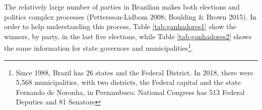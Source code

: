 \documentclass[
  12pt,
]{article}
\begin{document}
The relatively large number of parties in Brazilian makes both elections
and politics complex processes (Pettersson-Lidbom 2008; Boulding \&
Brown 2015). In order to help understanding this process, Table
\ref{tab:ganhadores1} show the winners, by party, in the last five
elections, while Table \ref{tab:ganhadores2} shows the same information
for state governors and municipalities\footnote{Since 1988, Brazil has
  26 states and the Federal District. In 2018, there were 5,568
  municipalities, with two districts, the Federal capital and the state
  Fernando de Noronha, in Pernambuco. National Congress has 513 Federal
  Deputies and 81 Senators}.

\begin{table}[H]

\caption{\label{tab:ganhadores1}Distribuition of winners by party in National Congress, 2002-2018}
\centering
{}
\end{table}
\end{document}
